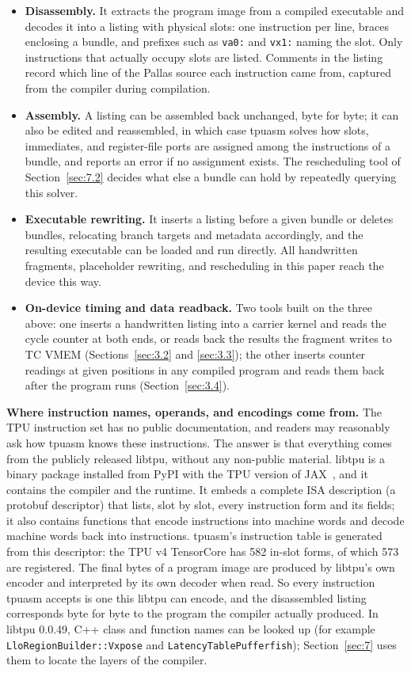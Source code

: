 \documentclass[sigconf,nonacm,balance=false]{acmart}
\newcommand{\code}[1]{\texttt{#1}}
\begin{document}
\begin{itemize}
\item \textbf{Disassembly.} It extracts the program image from a compiled executable and decodes it into a listing with physical slots: one instruction per line, braces enclosing a bundle, and prefixes such as \code{va0:} and \code{vx1:} naming the slot. Only instructions that actually occupy slots are listed. Comments in the listing record which line of the Pallas source each instruction came from, captured from the compiler during compilation.
\item \textbf{Assembly.} A listing can be assembled back unchanged, byte for byte; it can also be edited and reassembled, in which case tpuasm solves how slots, immediates, and register-file ports are assigned among the instructions of a bundle, and reports an error if no assignment exists. The rescheduling tool of Section~\ref{sec:7.2} decides what else a bundle can hold by repeatedly querying this solver.
\item \textbf{Executable rewriting.} It inserts a listing before a given bundle or deletes bundles, relocating branch targets and metadata accordingly, and the resulting executable can be loaded and run directly. All handwritten fragments, placeholder rewriting, and rescheduling in this paper reach the device this way.
\item \textbf{On-device timing and data readback.} Two tools built on the three above: one inserts a handwritten listing into a carrier kernel and reads the cycle counter at both ends, or reads back the results the fragment writes to TC VMEM (Sections~\ref{sec:3.2} and \ref{sec:3.3}); the other inserts counter readings at given positions in any compiled program and reads them back after the program runs (Section~\ref{sec:3.4}).
\end{itemize}

\textbf{Where instruction names, operands, and encodings come from.} The TPU instruction set has no public documentation, and readers may reasonably ask how tpuasm knows these instructions. The answer is that everything comes from the publicly released libtpu, without any non-public material. libtpu is a binary package installed from PyPI with the TPU version of JAX~\cite{libtpu}, and it contains the compiler and the runtime. It embeds a complete ISA description (a protobuf descriptor) that lists, slot by slot, every instruction form and its fields; it also contains functions that encode instructions into machine words and decode machine words back into instructions. tpuasm's instruction table is generated from this descriptor: the TPU v4 TensorCore has 582 in-slot forms, of which 573 are registered. The final bytes of a program image are produced by libtpu's own encoder and interpreted by its own decoder when read. So every instruction tpuasm accepts is one this libtpu can encode, and the disassembled listing corresponds byte for byte to the program the compiler actually produced. In libtpu 0.0.49, C++ class and function names can be looked up (for example \code{Llo\allowbreak{}Region\allowbreak{}Builder::\allowbreak{}Vxpose} and \code{Latency\allowbreak{}Table\allowbreak{}Pufferfish}); Section~\ref{sec:7} uses them to locate the layers of the compiler.
\end{document}
